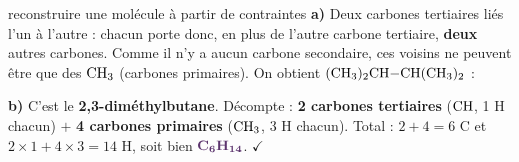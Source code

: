 \documentclass[11pt,a4paper]{article}
\newcommand{\rep}[1]{\textcolor{primarydark}{\textbf{#1}}}
\begin{document}
\begin{corr}{reconstruire une molécule à partir de contraintes}
\textbf{a)} Deux carbones tertiaires liés l'un à l'autre : chacun porte donc, en plus de l'autre carbone tertiaire, \textbf{deux} autres carbones. Comme il n'y a aucun carbone secondaire, ces voisins ne peuvent être que des $\ce{CH3}$ (carbones primaires). On obtient $(\ce{CH3})_2\ce{CH-CH}(\ce{CH3})_2$ :
\begin{center}\end{center}
\textbf{b)} C'est le \rep{2,3-diméthylbutane}. Décompte : \rep{2 carbones tertiaires} ($\ce{CH}$, 1 H chacun) $+$ \rep{4 carbones primaires} ($\ce{CH3}$, 3 H chacun). Total : $2+4=6$ C et $2\times1+4\times3=14$ H, soit bien $\rep{\ce{C6H14}}$. $\checkmark$
\end{corr}
\end{document}
